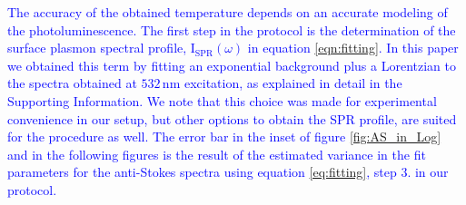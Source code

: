 \documentclass[journal=nalefd,manuscript=letter]{achemso}
\newcommand{\HI}[1]{\textcolor{blue}{#1}} %
\newcommand{\nm}{\ensuremath{\,\textrm{nm}}}
\begin{document}
\HI{The accuracy of the obtained temperature depends on an accurate
modeling of the photoluminescence. The first step in the \HI{protocol} is the determination
of the surface plasmon spectral profile, $\textrm{I}_\textrm{SPR}(\omega)$ in equation \ref{eqn:fitting}. 
In this paper we obtained this term by fitting an exponential background plus a Lorentzian to the spectra
obtained at $532\nm$ excitation, as explained in detail in the Supporting Information. We note
that this choice was made for experimental convenience in our setup, but other options to
obtain the SPR profile, are suited for the procedure as well.}
\HI{The error bar in the inset of figure \ref{fig:AS_in_Log} and in the following figures 
is the result of the estimated variance in the fit parameters for the 
anti-Stokes spectra using equation \ref{eq:fitting}, step 3. in our protocol.}

\end{document}
